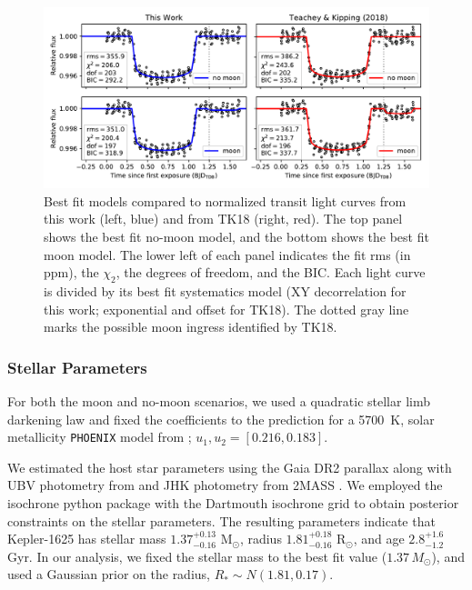 \documentclass[twocolumn]{aastex62}
\begin{document}
\begin{figure}
\includegraphics[width = 1.0 \textwidth]{figures/fig3_bestfits.pdf}
    \caption{Best fit models compared to normalized transit light curves from this work (left, blue) and from TK18 (right, red). The top panel shows the best fit no-moon model, and the bottom shows the best fit moon model. The lower left of each panel indicates the fit rms (in ppm), the $\chi_2$, the degrees of freedom, and the BIC.  Each light curve is divided by its best fit systematics model (XY decorrelation for this work; exponential and offset for TK18).  The dotted gray line marks the possible moon ingress identified by TK18.}
\label{fig:bestfit}
\end{figure}


\subsubsection{Stellar Parameters}
For both the moon and no-moon scenarios, we used a quadratic stellar limb darkening law and fixed the coefficients to the prediction for a 5700~K, solar metallicity \texttt{PHOENIX} model from \cite{espinoza15}; $u_1, u_2 = [0.216, 0.183]$.  

We estimated the host star parameters using the Gaia DR2 parallax \citep{Gaia, GaiaDR2} along with UBV photometry from \citet{Everett2012} and JHK photometry from 2MASS \citep{2MASS}. We employed the isochrone python package \citep{isochrone} with the Dartmouth isochrone grid \citep{Dotter2008} to obtain posterior constraints on the stellar parameters. The resulting parameters indicate that Kepler-1625 has stellar mass $1.37^{+0.13}_{-0.16}$ M$_{\odot}$, radius $1.81^{+0.18}_{-0.16}$ R$_{\odot}$, and age $2.8^{+1.6}_{-1.2}$ Gyr. In our analysis, we fixed the stellar mass to the best fit value ($1.37\,M_\odot$), and used a Gaussian prior on the radius, $R_* \sim N(1.81, 0.17)$.
\end{document}
